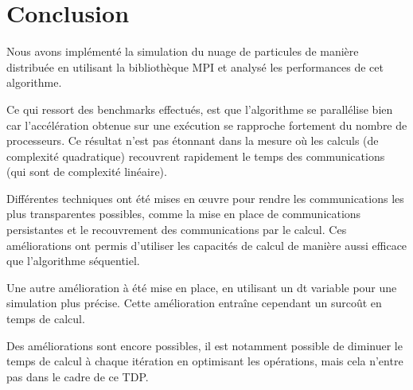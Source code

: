 \section*{Conclusion}

Nous avons implémenté la simulation du nuage de particules de manière distribuée en utilisant la bibliothèque MPI et analysé les performances de cet algorithme.

Ce qui ressort des benchmarks effectués, est que l'algorithme se parallélise bien car l'accélération obtenue sur une exécution se rapproche fortement du nombre de processeurs. Ce résultat n'est pas étonnant dans la mesure où les calculs (de complexité quadratique) recouvrent rapidement le temps des communications (qui sont de complexité linéaire). 

Différentes techniques ont été mises en \oe uvre pour rendre les communications les plus transparentes possibles, comme la mise en place de communications persistantes et le recouvrement des communications par le calcul. Ces améliorations ont permis d'utiliser les capacités de calcul de manière aussi efficace que l'algorithme séquentiel.

Une autre amélioration à été mise en place, en utilisant un dt variable pour une simulation plus précise. Cette amélioration entraîne cependant un surcoût en temps de calcul.

Des améliorations sont encore possibles, il est notamment possible de diminuer le temps de calcul à chaque itération en optimisant les opérations, mais cela n'entre pas dans le cadre de ce TDP.
